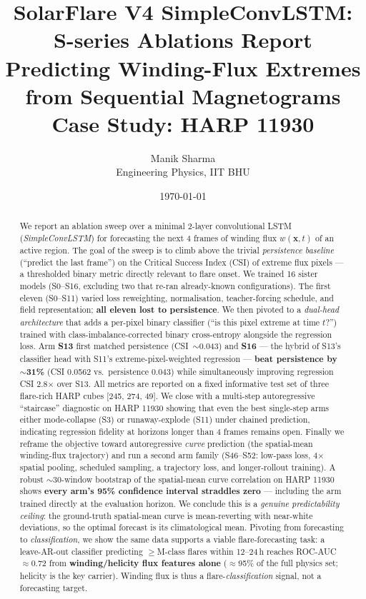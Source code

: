 \documentclass[11pt,a4paper]{article}
\title{\textbf{SolarFlare V4 SimpleConvLSTM:\\ S-series Ablations Report}\\
       \large Predicting Winding-Flux Extremes from Sequential Magnetograms\\
       \large Case Study: HARP 11930}
\author{Manik Sharma\\\small{Engineering Physics, IIT BHU}}
\date{\today}
\begin{document}
\maketitle
\thispagestyle{empty}

\begin{abstract}
\noindent
We report an ablation sweep over a minimal 2-layer convolutional LSTM
(\emph{SimpleConvLSTM}) for forecasting the next 4 frames of winding
flux \(w(\mathbf{x},t)\) of an active region. The goal of the
sweep is to climb above the trivial \emph{persistence baseline}
(``predict the last frame'') on the Critical Success Index (CSI) of
extreme flux pixels --- a thresholded binary metric directly relevant
to flare onset.
We trained 16 sister models (S0--S16, excluding two that re-ran already-known
configurations). The first eleven (S0--S11) varied loss
re\-weighting, normalisation, teacher-forcing schedule, and field
representation; \textbf{all eleven lost to persistence}. We then pivoted
to a \emph{dual-head architecture} that adds a per-pixel binary
classifier (``is this pixel extreme at time \(t\)?'') trained with
class-imbalance-corrected binary cross-entropy alongside the regression
loss. Arm \textbf{S13} first matched persistence
(CSI~\(\sim\)0.043) and \textbf{S16} --- the hybrid of S13's classifier
head with S11's extreme-pixel-weighted regression --- \textbf{beat
persistence by \(\sim\)31\%} (CSI 0.0562 vs.\ persistence 0.043) while
simultaneously improving regression CSI 2.8\(\times\) over S13. All
metrics are reported on a fixed informative test set of three flare-rich
HARP cubes [245, 274, 49]. We close with a multi-step autoregressive
``staircase'' diagnostic on HARP 11930 showing that even the best
single-step arms either mode-collapse (S3) or runaway-explode (S11)
under chained prediction, indicating regression fidelity at horizons
longer than 4 frames remains open.
Finally we reframe the objective toward autoregressive \emph{curve}
prediction (the spatial-mean winding-flux trajectory) and run a second
arm family (S46--S52: low-pass loss, 4\(\times\) spatial pooling,
scheduled sampling, a trajectory loss, and longer-rollout training).
A robust $\sim$30-window bootstrap of the spatial-mean curve correlation
on HARP 11930 shows \textbf{every arm's 95\% confidence interval straddles
zero} --- including the arm trained directly at the evaluation horizon.
We conclude this is a \emph{genuine predictability ceiling}: the
ground-truth spatial-mean curve is mean-reverting with near-white
deviations, so the optimal forecast is its climatological mean.
Pivoting from forecasting to \emph{classification}, we show the same
data supports a viable flare-forecasting task: a leave-AR-out classifier
predicting \(\ge\)M-class flares within 12--24\,h reaches ROC-AUC
\(\approx\)0.72 from \textbf{winding/helicity flux features alone}
(\(\approx\)95\% of the full physics set; helicity is the key carrier).
Winding flux is thus a flare-\emph{classification} signal, not a
forecasting target.
\end{abstract}
\end{document}

